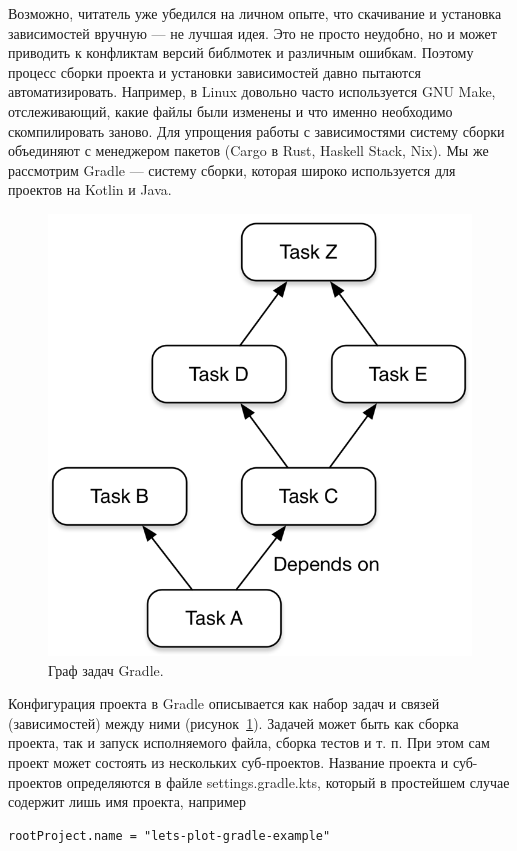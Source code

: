 \documentclass{book}
\begin{document}
Возможно, читатель уже убедился на личном опыте, что скачивание и установка зависимостей вручную
--- не лучшая идея. Это не просто неудобно, но и может приводить к конфликтам версий библмотек и
различным ошибкам. Поэтому процесс сборки проекта и установки зависимостей давно пытаются
автоматизировать. Например, в Linux довольно часто используется GNU Make, отслеживающий, какие
файлы были изменены и что именно необходимо скомпилировать заново. Для упрощения работы с
зависимостями систему сборки объединяют с менеджером пакетов (Cargo в Rust, Haskell Stack, Nix). Мы
же рассмотрим Gradle --- систему сборки, которая широко используется для проектов на Kotlin и Java.

\begin{figure}
    \includegraphics[width = 0.5\linewidth]{gradle_graph.png}
    \caption{\label{gradle_graph}Граф задач Gradle.}
\end{figure}

Конфигурация проекта в Gradle описывается как набор задач и связей (зависимостей) между ними
(рисунок~\ref{gradle_graph}). Задачей может быть как сборка проекта, так и запуск исполняемого
файла, сборка тестов и т. п. При этом сам проект может состоять из нескольких суб-проектов.
Название проекта и суб-проектов определяются в файле settings.gradle.kts, который в простейшем
случае содержит лишь имя проекта, например
\begin{verbatim}
rootProject.name = "lets-plot-gradle-example"
\end{verbatim}
\end{document}
